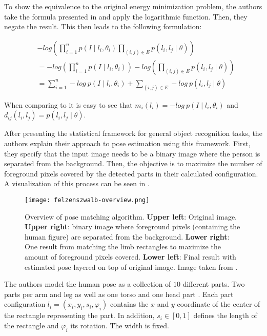 To show the equivalence to the original energy minimization problem, the authors take the formula presented in  and apply the logarithmic function. Then, they negate the result.
This then leads to the following formulation:

\begin{equation}
    \label{eq:neg-log-posterior}
    \begin{split}
        &-log \left( \prod_{i=1}^n p(I \mid l_i, \theta_i) \prod_{(i, j) \in E} p(l_i, l_j \mid \theta) \right) \\
        &= -log \left( \prod_{i=1}^n p(I \mid l_i, \theta_i) \right) - log \left( \prod_{(i, j) \in E} p(l_i, l_j \mid \theta)\right) \\
        &= \sum_{i=1}^n -log ~ p(I \mid l_i, \theta_i) + \sum_{(i, j) \in E} - log ~ p(l_i, l_j \mid \theta)
    \end{split}
\end{equation}

When comparing  to  it is easy to see that $m_i(l_i) = - log ~ p(I \mid l_i, \theta_i)$ and $d_{ij}(l_i, l_j) = p(l_i, l_j \mid \theta)$.

After presenting the statistical framework for general object recognition tasks, the authors explain their approach to pose estimation using this framework.
First, they specify that the input image needs to be a binary image where the person is separated from the background.
Then, the objective is to maximize the number of foreground pixels covered by the detected parts in their calculated configuration.
A visualization of this process can be seen in .

\begin{figure}[htb!]
    \centering
    \texttt{[image: felzenszwalb-overview.png]}
    \caption{Overview of pose matching algorithm. \textbf{Upper left}: Original image. \textbf{Upper right}: binary image where foreground pixels (containing the human figure) are separated from the background. \textbf{Lower right}: One result from matching the limb rectangles to maximize the amount of foreground pixels covered. \textbf{Lower left}: Final result with estimated pose layered on top of original image. Image taken from \cite{felzenszwalb_pictorial_2005}.}
    \label{fig:felzenszwalb-overview}
\end{figure}

The authors model the human pose as a collection of $10$ different parts. 
Two parts per arm and leg as well as one torso and one head part .
Each part configuration $l_i = (x_i, y_i, s_i , \varphi_i)$ contains the $x$ and $y$ coordinate of the center of the rectangle representing the part.
In addition, $s_i \in [0,1]$ defines the length of the rectangle and $\varphi_i$ its rotation.
The width is fixed.

